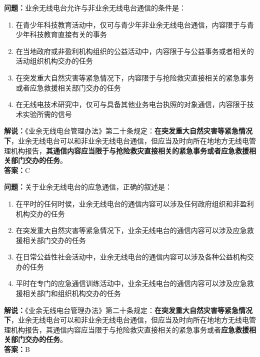 \bigskip


\noindent\textbf{问题：}业余无线电台允许与非业余无线电台通信的条件是：
\begin{enumerate}[label=\Alph*), leftmargin=3em]
	\item 在青少年科技教育活动中，仅可与青少年非业余无线电台通信，内容限于与青少年科技教育直接有关的事务
	\item 在当地政府或非盈利机构组织的公益活动中，内容限于与公益事务或者相关的活动组织机构交办的任务
	\item 在突发重大自然灾害等紧急情况下，内容限于与抢险救灾直接相关的紧急事务或者应急救援相关部门交办的任务
	\item 在无线电技术研究中，仅可与具备其他业务电台执照的对象通信，内容限于技术实验所需的信号
\end{enumerate}
\noindent\textbf{解说：}《业余无线电台管理办法》第二十条规定：\textbf{在突发重大自然灾害等紧急情况下}，业余无线电台可以和非业余无线电台通信，但应当及时向所在地地方无线电管理机构报告，\textbf{其通信内容应当限于与抢险救灾直接相关的紧急事务或者应急救援相关部门交办的任务}。\\\noindent\textbf{答案：}C



\bigskip


\noindent\textbf{问题：}关于业余无线电台的应急通信，正确的叙述是：
\begin{enumerate}[label=\Alph*), leftmargin=3em]
	\item 在平时的任何时侯，业余无线电台的通信内容可以涉及任何政府组织和非盈利机构交办的任务
	\item 在突发重大自然灾害等紧急情况下，业余无线电台的通信内容可以涉及应急救援相关部门交办的任务
	\item 在日常公益性社会活动中，业余无线电台的通信内容可以涉及各种公益机构交办的任务
	\item 平时在专门的应急通信训练活动中，业余无线电台的通信内容可以涉及应急救援相关部门和组织机构交办的任务
\end{enumerate}
\noindent\textbf{解说：}《业余无线电台管理办法》第二十条规定：\textbf{在突发重大自然灾害等紧急情况下}，业余无线电台可以和非业余无线电台通信，但应当及时向所在地地方无线电管理机构报告，其通信内容应当限于与抢险救灾直接相关的紧急事务或者\textbf{应急救援相关部门交办的任务}。\\\noindent\textbf{答案：}B




\bigskip


